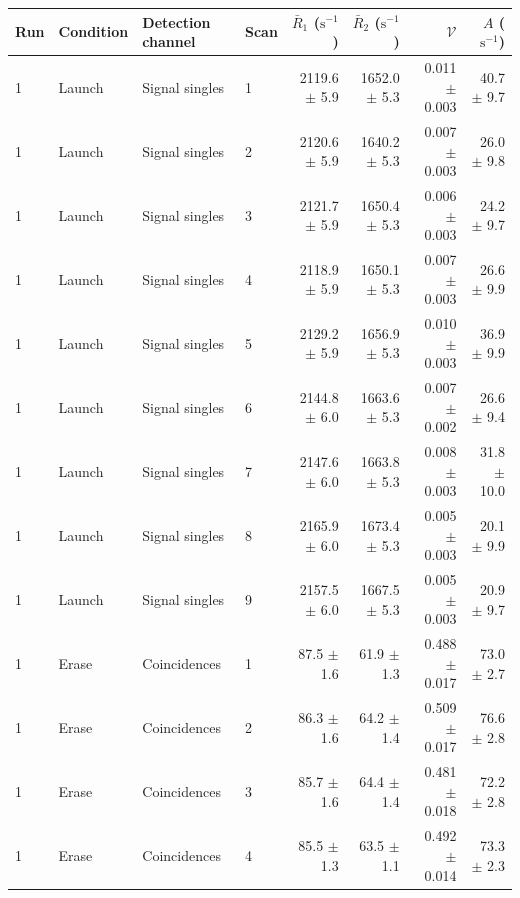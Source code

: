 \begin{tabular}{llllrrrr}
\toprule
Run & Condition & Detection channel & Scan & $\bar R_1$ ($\mathrm{s}^{-1}$) & $\bar R_2$ ($\mathrm{s}^{-1}$) & $\mathcal{V}$ & $A$ ($\mathrm{s}^{-1}$) \\
\midrule
1 & Launch & Signal singles & 1 & 2119.6 \ensuremath{\pm} 5.9 & 1652.0 \ensuremath{\pm} 5.3 & 0.011 \ensuremath{\pm} 0.003 & 40.7 \ensuremath{\pm} 9.7 \\
1 & Launch & Signal singles & 2 & 2120.6 \ensuremath{\pm} 5.9 & 1640.2 \ensuremath{\pm} 5.3 & 0.007 \ensuremath{\pm} 0.003 & 26.0 \ensuremath{\pm} 9.8 \\
1 & Launch & Signal singles & 3 & 2121.7 \ensuremath{\pm} 5.9 & 1650.4 \ensuremath{\pm} 5.3 & 0.006 \ensuremath{\pm} 0.003 & 24.2 \ensuremath{\pm} 9.7 \\
1 & Launch & Signal singles & 4 & 2118.9 \ensuremath{\pm} 5.9 & 1650.1 \ensuremath{\pm} 5.3 & 0.007 \ensuremath{\pm} 0.003 & 26.6 \ensuremath{\pm} 9.9 \\
1 & Launch & Signal singles & 5 & 2129.2 \ensuremath{\pm} 5.9 & 1656.9 \ensuremath{\pm} 5.3 & 0.010 \ensuremath{\pm} 0.003 & 36.9 \ensuremath{\pm} 9.9 \\
1 & Launch & Signal singles & 6 & 2144.8 \ensuremath{\pm} 6.0 & 1663.6 \ensuremath{\pm} 5.3 & 0.007 \ensuremath{\pm} 0.002 & 26.6 \ensuremath{\pm} 9.4 \\
1 & Launch & Signal singles & 7 & 2147.6 \ensuremath{\pm} 6.0 & 1663.8 \ensuremath{\pm} 5.3 & 0.008 \ensuremath{\pm} 0.003 & 31.8 \ensuremath{\pm} 10.0 \\
1 & Launch & Signal singles & 8 & 2165.9 \ensuremath{\pm} 6.0 & 1673.4 \ensuremath{\pm} 5.3 & 0.005 \ensuremath{\pm} 0.003 & 20.1 \ensuremath{\pm} 9.9 \\
1 & Launch & Signal singles & 9 & 2157.5 \ensuremath{\pm} 6.0 & 1667.5 \ensuremath{\pm} 5.3 & 0.005 \ensuremath{\pm} 0.003 & 20.9 \ensuremath{\pm} 9.7 \\
\midrule
1 & Erase & Coincidences & 1 & 87.5 \ensuremath{\pm} 1.6 & 61.9 \ensuremath{\pm} 1.3 & 0.488 \ensuremath{\pm} 0.017 & 73.0 \ensuremath{\pm} 2.7 \\
1 & Erase & Coincidences & 2 & 86.3 \ensuremath{\pm} 1.6 & 64.2 \ensuremath{\pm} 1.4 & 0.509 \ensuremath{\pm} 0.017 & 76.6 \ensuremath{\pm} 2.8 \\
1 & Erase & Coincidences & 3 & 85.7 \ensuremath{\pm} 1.6 & 64.4 \ensuremath{\pm} 1.4 & 0.481 \ensuremath{\pm} 0.018 & 72.2 \ensuremath{\pm} 2.8 \\
1 & Erase & Coincidences & 4 & 85.5 \ensuremath{\pm} 1.3 & 63.5 \ensuremath{\pm} 1.1 & 0.492 \ensuremath{\pm} 0.014 & 73.3 \ensuremath{\pm} 2.3 \\

\end{tabular}
